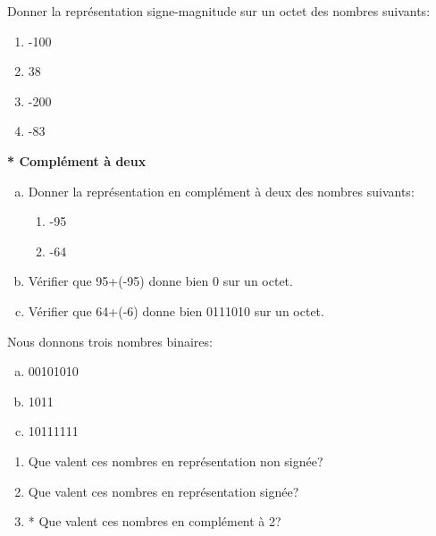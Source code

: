 \documentclass[11pt, a4paper]{book}
\begin{document}


\begin{exercice}
Donner la représentation signe-magnitude sur un octet des nombres suivants:
\begin{multicols}{2}
\begin{enumerate}
 	\item -100
 	\item 38
 	\item -200
 	\item -83
\end{enumerate}
\end{multicols}
\end{exercice}


\begin{exercice}\textbf{* Complément à deux }
\begin{enumerate}[a)]
\item Donner la représentation en complément à deux des nombres suivants:

\begin{enumerate}
\item -95
\item -64
\end{enumerate}

\item Vérifier que 95+(-95) donne bien 0 sur un octet.
\item Vérifier que 64+(-6) donne bien 0111010 sur un octet.
\end{enumerate}
\end{exercice}


\begin{exercice}
Nous donnons trois nombres binaires:
\begin{enumerate}[a)]
\item 00101010
\item 1011
\item 10111111
\end{enumerate}

\begin{enumerate}
\item Que valent ces nombres en représentation non signée?
\item Que valent ces nombres en représentation signée?
\item * Que valent ces nombres en complément à 2?
\end{enumerate}
\end{exercice}
\end{document}
